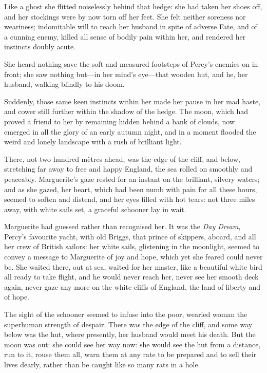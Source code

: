 Like a ghost she flitted noiselessly behind that hedge: she had taken her shoes off, and her stockings were by now torn off her feet. She felt neither soreness nor weariness; indomitable will to reach her husband in spite of adverse Fate, and of a cunning enemy, killed all sense of bodily pain within her, and rendered her instincts doubly acute.

She heard nothing save the soft and measured footsteps of Percy's enemies on in front; she saw nothing but—in her mind's eye—that wooden hut, and he, her husband, walking blindly to his doom.

Suddenly, those same keen instincts within her made her pause in her mad haste, and cower still further within the shadow of the hedge. The moon, which had proved a friend to her by remaining hidden behind a bank of clouds, now emerged in all the glory of an early autumn night, and in a moment flooded the weird and lonely landscape with a rush of brilliant light.

There, not two hundred mètres ahead, was the edge of the cliff, and below, stretching far away to free and happy England, the sea rolled on smoothly and peaceably. Marguerite's gaze rested for an instant on the brilliant, silvery waters; and as she gazed, her heart, which had been numb with pain for all these hours, seemed to soften and distend, and her eyes filled with hot tears: not three miles away, with white sails set, a graceful schooner lay in wait.

Marguerite had guessed rather than recognised her. It was the \textit{Day Dream}, Percy's favourite yacht, with old Briggs, that prince of skippers, aboard, and all her crew of British sailors: her white sails, glistening in the moonlight, seemed to convey a message to Marguerite of joy and hope, which yet she feared could never be. She waited there, out at sea, waited for her master, like a beautiful white bird all ready to take flight, and he would never reach her, never see her smooth deck again, never gaze any more on the white cliffs of England, the land of liberty and of hope.

The sight of the schooner seemed to infuse into the poor, wearied woman the superhuman strength of despair. There was the edge of the cliff, and some way below was the hut, where presently, her husband would meet his death. But the moon was out: she could see her way now: she would see the hut from a distance, run to it, rouse them all, warn them at any rate to be prepared and to sell their lives dearly, rather than be caught like so many rats in a hole.

